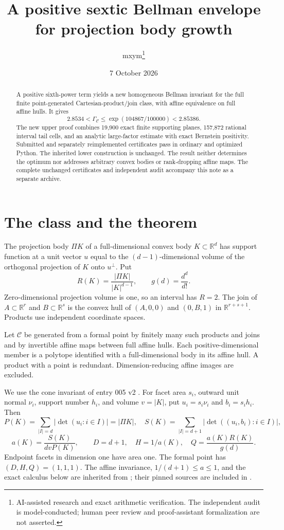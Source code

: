 \documentclass[11pt]{article}
\title{A positive sextic Bellman envelope\\for projection body growth}
\author{mxym\thanks{AI-assisted research and exact arithmetic verification. The independent audit is model-conducted; human peer review and proof-assistant formalization are not asserted.}}
\date{7 October 2026}
\newcommand{\CC}{\mathcal C}
\newcommand{\code}[1]{\texttt{\detokenize{#1}}}
\begin{document}
\maketitle
\begin{abstract}
A positive sixth-power term yields a new homogeneous Bellman invariant for the full finite point-generated Cartesian-product/join class, with affine equivalence on full affine hulls. It gives
\[
 2.8534<\Gamma_{\CC}\le \exp(104867/100000)<2.85386.
\]
The new upper proof combines 19,900 exact finite supporting planes, 157,872 rational interval tail cells, and an analytic large-factor estimate with exact Bernstein positivity. Submitted and separately reimplemented certificates pass in ordinary and optimized Python. The inherited lower construction is unchanged. The result neither determines the optimum nor addresses arbitrary convex bodies or rank-dropping affine maps. The complete unchanged certificates and independent audit accompany this note as a separate archive.
\end{abstract}

\section{The class and the theorem}
The projection body $\Pi K$ of a full-dimensional convex body $K\subset\mathbb R^d$ has support function at a unit vector $u$ equal to the $(d-1)$-dimensional volume of the orthogonal projection of $K$ onto $u^\perp$. Put
\[
 R(K)=\frac{|\Pi K|}{|K|^{d-1}},\qquad g(d)=\frac{d^d}{d!}.
\]
Zero-dimensional projection volume is one, so an interval has $R=2$. The join of $A\subset\mathbb R^r$ and $B\subset\mathbb R^s$ is the convex hull of $(A,0,0)$ and $(0,B,1)$ in $\mathbb R^{r+s+1}$. Products use independent coordinate spaces.

Let $\CC$ be generated from a formal point by finitely many such products and joins and by invertible affine maps between full affine hulls. Each positive-dimensional member is a polytope identified with a full-dimensional body in its affine hull. A product with a point is redundant. Dimension-reducing affine images are excluded.

We use the cone invariant of entry 005 v2 \cite{calculus}. For facet area $s_i$, outward unit normal $\nu_i$, support number $h_i$, and volume $v=|K|$, put $u_i=s_i\nu_i$ and $b_i=s_i h_i$. Then
\[
 P(K)=\sum_{|I|=d}|\det(u_i:i\in I)|=|\Pi K|,
\quad S(K)=\sum_{|I|=d+1}|\det((u_i,b_i):i\in I)|,
\]
\[
 a(K)=\frac{S(K)}{dvP(K)},\qquad D=d+1,\quad H=1/a(K),\quad
 Q=\frac{a(K)R(K)}{g(d)}.
\]
Endpoint facets in dimension one have area one. The formal point has $(D,H,Q)=(1,1,1)$. The affine invariance, $1/(d+1)\le a\le1$, and the exact calculus below are inherited from \cite{calculus}; their pinned sources are included in \code{dependencies/v2}.
\end{document}
